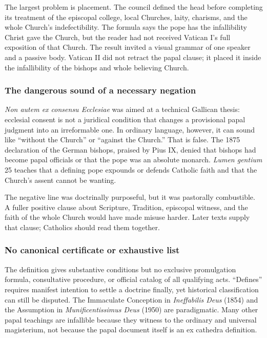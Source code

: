 The largest problem is placement. The council defined the head before completing its treatment of the episcopal college, local Churches, laity, charisms, and the whole Church's indefectibility. The formula says the pope has the infallibility Christ gave the Church, but the reader had not received Vatican I's full exposition of that Church. The result invited a visual grammar of one speaker and a passive body. Vatican II did not retract the papal clause; it placed it inside the infallibility of the bishops and whole believing Church.

\subsubsection{The dangerous sound of a necessary negation}

\emph{Non autem ex consensu Ecclesiae} was aimed at a technical Gallican thesis: ecclesial consent is not a juridical condition that changes a provisional papal judgment into an irreformable one. In ordinary language, however, it can sound like “without the Church” or “against the Church.” That is false. The 1875 declaration of the German bishops, praised by Pius IX, denied that bishops had become papal officials or that the pope was an absolute monarch. \emph{Lumen gentium} 25 teaches that a defining pope expounds or defends Catholic faith and that the Church's assent cannot be wanting.

The negative line was doctrinally purposeful, but it was pastorally combustible. A fuller positive clause about Scripture, Tradition, episcopal witness, and the faith of the whole Church would have made misuse harder. Later texts supply that clause; Catholics should read them together.

\subsubsection{No canonical certificate or exhaustive list}

The definition gives substantive conditions but no exclusive promulgation formula, consultative procedure, or official catalog of all qualifying acts. “Defines” requires manifest intention to settle a doctrine finally, yet historical classification can still be disputed. The Immaculate Conception in \emph{Ineffabilis Deus} (1854) and the Assumption in \emph{Munificentissimus Deus} (1950) are paradigmatic. Many other papal teachings are infallible because they witness to the ordinary and universal magisterium, not because the papal document itself is an ex cathedra definition.

